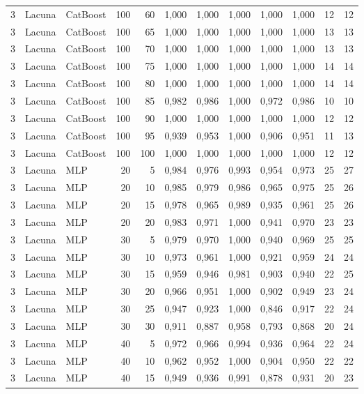 \begin{longtable}{@{}rllrrrrrrrrr@{}}
3 & Lacuna & CatBoost & 100 & 60 & 1,000 & 1,000 & 1,000 & 1,000 & 1,000 & 12 & 12 \\
3 & Lacuna & CatBoost & 100 & 65 & 1,000 & 1,000 & 1,000 & 1,000 & 1,000 & 13 & 13 \\
3 & Lacuna & CatBoost & 100 & 70 & 1,000 & 1,000 & 1,000 & 1,000 & 1,000 & 13 & 13 \\
3 & Lacuna & CatBoost & 100 & 75 & 1,000 & 1,000 & 1,000 & 1,000 & 1,000 & 14 & 14 \\
3 & Lacuna & CatBoost & 100 & 80 & 1,000 & 1,000 & 1,000 & 1,000 & 1,000 & 14 & 14 \\
3 & Lacuna & CatBoost & 100 & 85 & 0,982 & 0,986 & 1,000 & 0,972 & 0,986 & 10 & 10 \\
3 & Lacuna & CatBoost & 100 & 90 & 1,000 & 1,000 & 1,000 & 1,000 & 1,000 & 12 & 12 \\
3 & Lacuna & CatBoost & 100 & 95 & 0,939 & 0,953 & 1,000 & 0,906 & 0,951 & 11 & 13 \\
3 & Lacuna & CatBoost & 100 & 100 & 1,000 & 1,000 & 1,000 & 1,000 & 1,000 & 12 & 12 \\
3 & Lacuna & MLP & 20 & 5 & 0,984 & 0,976 & 0,993 & 0,954 & 0,973 & 25 & 27 \\
3 & Lacuna & MLP & 20 & 10 & 0,985 & 0,979 & 0,986 & 0,965 & 0,975 & 25 & 26 \\
3 & Lacuna & MLP & 20 & 15 & 0,978 & 0,965 & 0,989 & 0,935 & 0,961 & 25 & 26 \\
3 & Lacuna & MLP & 20 & 20 & 0,983 & 0,971 & 1,000 & 0,941 & 0,970 & 23 & 23 \\
3 & Lacuna & MLP & 30 & 5 & 0,979 & 0,970 & 1,000 & 0,940 & 0,969 & 25 & 25 \\
3 & Lacuna & MLP & 30 & 10 & 0,973 & 0,961 & 1,000 & 0,921 & 0,959 & 24 & 24 \\
3 & Lacuna & MLP & 30 & 15 & 0,959 & 0,946 & 0,981 & 0,903 & 0,940 & 22 & 25 \\
3 & Lacuna & MLP & 30 & 20 & 0,966 & 0,951 & 1,000 & 0,902 & 0,949 & 23 & 24 \\
3 & Lacuna & MLP & 30 & 25 & 0,947 & 0,923 & 1,000 & 0,846 & 0,917 & 22 & 24 \\
3 & Lacuna & MLP & 30 & 30 & 0,911 & 0,887 & 0,958 & 0,793 & 0,868 & 20 & 24 \\
3 & Lacuna & MLP & 40 & 5 & 0,972 & 0,966 & 0,994 & 0,936 & 0,964 & 22 & 24 \\
3 & Lacuna & MLP & 40 & 10 & 0,962 & 0,952 & 1,000 & 0,904 & 0,950 & 22 & 22 \\
3 & Lacuna & MLP & 40 & 15 & 0,949 & 0,936 & 0,991 & 0,878 & 0,931 & 20 & 23 \\

\end{longtable}
